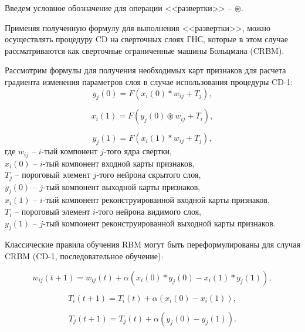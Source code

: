 Введем условное обозначение для операции <<развертки>> -- $\circledast$.

Применяя полученную формулу для выполнения <<развертки>>, можно осуществлять процедуру CD на сверточных слоях ГНС, которые в этом случае рассматриваются как сверточные ограниченные машины Больцмана (CRBM). 

Рассмотрим формулы для получения необходимых карт признаков для расчета градиента изменения параметров слоя в случае использования процедуры CD-1: 
\begin{equation*}
    y_j(0) = F(x_i(0) * w_{ij} + T_j),
\end{equation*}

\begin{equation*}
    x_i(1) = F(y_j(0) \circledast w_{ij} + T_i),
\end{equation*}

\begin{equation*}
    y_j(1) = F(x_i(1) * w_{ij} + T_j),
\end{equation*}
где $w_{ij}$ -- $i$-тый компонент $j$-того ядра свертки,\\
$x_i(0)$ -- $i$-тый компонент входной карты признаков,\\
$T_j$ -- пороговый элемент $j$-того нейрона скрытого слоя,\\
$y_j(0)$ -- $j$-тый компонент выходной карты признаков,\\
$x_i(1)$ -- $i$-тый компонент реконструированной входной карты признаков,\\
$T_i$ -- пороговый элемент $i$-того нейрона видимого слоя,\\
$y_j(1)$ -- $j$-тый компонент реконструированной выходной карты признаков.

Классические правила обучения RBM могут быть переформулированы для случая CRBM (CD-1, последовательное обучение): 

\begin{equation*}
		w_{ij}(t+1)=w_{ij}(t)+\alpha(x_i(0) * y_j(0)-x_i(1) * y_j(1)),
\end{equation*} 

\begin{equation*}	
		T_i(t+1)=T_i(t)+\alpha(x_i(0)-x_i(1)),
\end{equation*} 

\begin{equation*}		
		T_j(t+1)=T_j(t)+\alpha(y_j(0)-y_j(1)).
\end{equation*}

